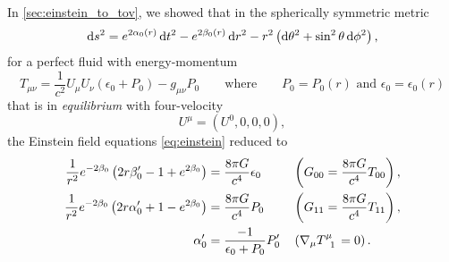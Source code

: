 In \cref{sec:einstein_to_tov}, we showed that in the spherically symmetric metric
\begin{equation}
	\mathop{}\!\mathrm{d} s^2 = e^{2 \alpha_0(r)} \mathop{}\!\mathrm{d} t^2 - e^{2 \beta_0(r)} \mathop{}\!\mathrm{d} r^2 - r^2 \left( \mathop{}\!\mathrm{d} \theta^2 + \sin^2 \theta \mathop{}\!\mathrm{d} \phi^2 \right) ,
\end{equation}
for a perfect fluid with energy-momentum
\begin{equation}
	T_{\mu \nu} = \frac{1}{c^2} U_\mu U_\nu (\epsilon_0 + P_0) - g_{\mu \nu} P_0
	\qquad \text{where} \qquad
	P_0 = P_0(r) \text{ and } \epsilon_0 = \epsilon_0(r)
\label{eq:nstars:energy_momentum}
\end{equation}
that is in \emph{equilibrium} with four-velocity
\begin{equation}
	U^\mu = (U^0, 0, 0, 0) ,
\label{eq:nstars:velocity_equilibrium}
\end{equation}
the Einstein field equations \eqref{eq:einstein} reduced to
\begin{subequations}%
\begin{align}%
	\frac{1}{r^2} e^{-2 \beta_0} \left( 2 r \beta_0' - 1 + e^{2 \beta_0} \right)  &= \frac{8 \pi G}{c^4} \epsilon_0   && \left( G_{00} = \frac{8 \pi G}{c^4} T_{00} \right) , \label{eq:nstars:field_equations_equilibrium_00} \\
	\frac{1}{r^2} e^{-2 \beta_0} \left( 2 r \alpha_0' + 1 - e^{2 \beta_0} \right) &= \frac{8 \pi G}{c^4} P_0          && \left( G_{11} = \frac{8 \pi G}{c^4} T_{11} \right) , \label{eq:nstars:field_equations_equilibrium_11} \\
	\alpha_0'                                                                     &= \frac{-1}{\epsilon_0 + P_0} P_0' && \left( \nabla_\mu T\indices{^\mu_1} = 0 \right)    . \label{eq:nstars:field_equations_equilibrium_T}
\end{align}%
\label{eq:nstars:field_equations_equilibrium}%
\end{subequations}%

